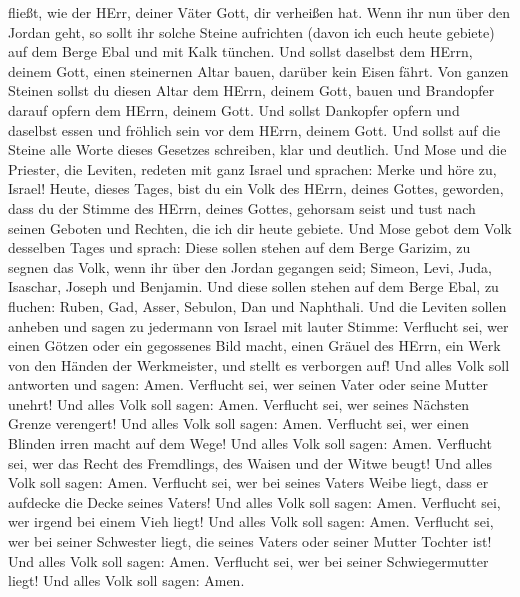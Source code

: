 fließt, wie der HErr, deiner Väter Gott, dir verheißen hat. 
Wenn ihr nun über den Jordan geht, so sollt ihr solche Steine aufrichten
(davon ich euch heute gebiete) auf dem Berge Ebal und mit Kalk tünchen.
 Und sollst daselbst dem HErrn, deinem Gott, einen
steinernen Altar bauen, darüber kein Eisen fährt.  Von
ganzen Steinen sollst du diesen Altar dem HErrn, deinem Gott, bauen und
Brandopfer darauf opfern dem HErrn, deinem Gott.  Und sollst
Dankopfer opfern und daselbst essen und fröhlich sein vor dem HErrn,
deinem Gott.  Und sollst auf die Steine alle Worte dieses
Gesetzes schreiben, klar und deutlich.  Und Mose und die
Priester, die Leviten, redeten mit ganz Israel und sprachen: Merke und
höre zu, Israel! Heute, dieses Tages, bist du ein Volk des HErrn, deines
Gottes, geworden,  dass du der Stimme des HErrn, deines
Gottes, gehorsam seist und tust nach seinen Geboten und Rechten, die ich
dir heute gebiete.  Und Mose gebot dem Volk desselben Tages
und sprach:  Diese sollen stehen auf dem Berge Garizim, zu
segnen das Volk, wenn ihr über den Jordan gegangen seid; Simeon, Levi,
Juda, Isaschar, Joseph und Benjamin.  Und diese sollen
stehen auf dem Berge Ebal, zu fluchen: Ruben, Gad, Asser, Sebulon, Dan
und Naphthali.  Und die Leviten sollen anheben und sagen zu
jedermann von Israel mit lauter Stimme:  Verflucht sei, wer
einen Götzen oder ein gegossenes Bild macht, einen Gräuel des HErrn, ein
Werk von den Händen der Werkmeister, und stellt es verborgen auf! Und
alles Volk soll antworten und sagen: Amen.  Verflucht sei,
wer seinen Vater oder seine Mutter unehrt! Und alles Volk soll sagen:
Amen.  Verflucht sei, wer seines Nächsten Grenze verengert!
Und alles Volk soll sagen: Amen.  Verflucht sei, wer einen
Blinden irren macht auf dem Wege! Und alles Volk soll sagen: Amen.
 Verflucht sei, wer das Recht des Fremdlings, des Waisen
und der Witwe beugt! Und alles Volk soll sagen: Amen. 
Verflucht sei, wer bei seines Vaters Weibe liegt, dass er aufdecke die
Decke seines Vaters! Und alles Volk soll sagen: Amen. 
Verflucht sei, wer irgend bei einem Vieh liegt! Und alles Volk soll
sagen: Amen.  Verflucht sei, wer bei seiner Schwester
liegt, die seines Vaters oder seiner Mutter Tochter ist! Und alles Volk
soll sagen: Amen.  Verflucht sei, wer bei seiner
Schwiegermutter liegt! Und alles Volk soll sagen: Amen. 

